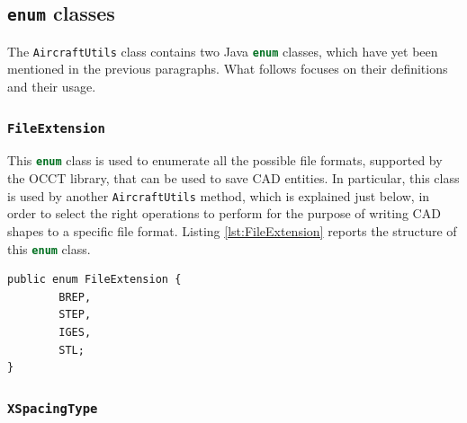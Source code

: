 \subsection{\texttt{enum} classes}
\label{sec3.5.2}

The \lstinline[language=Java]!AircraftUtils! class contains two Java \lstinline[language=Java]!enum! classes, which have yet been mentioned in the previous paragraphs. What follows focuses on their definitions and their usage.

\subsubsection{\texttt{FileExtension}}

This \lstinline[language=Java]!enum! class is used to enumerate all the possible file formats, supported by the \gls{OCCT} library, that can be used to save \gls{CAD} entities. In particular, this class is used by another \lstinline[language=Java]!AircraftUtils! method, which is explained just below, in order to select the right operations to perform for the purpose of writing \gls{CAD} shapes to a specific file format. Listing \ref{lst:FileExtension} reports the structure of this \lstinline[language=Java]!enum! class.
%
\bigskip
\begin{lstlisting}[caption={\lstinline!FileExtension! class}, captionpos=b, tabsize=2, label={lst:FileExtension}]
public enum FileExtension {
		BREP,
		STEP,
		IGES,
		STL;
}
\end{lstlisting}

\subsubsection{\texttt{XSpacingType}}

